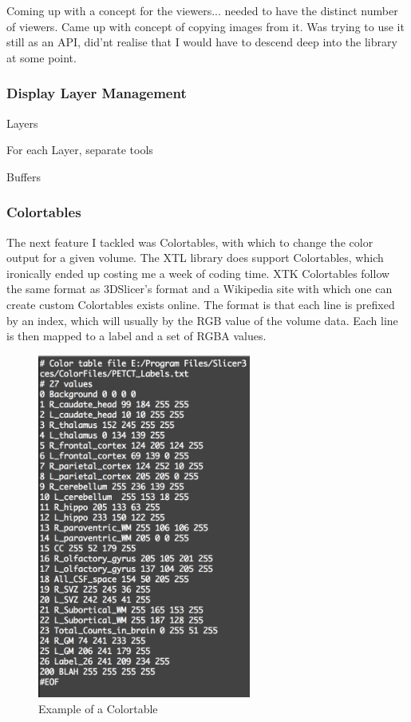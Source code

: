 \documentclass[a4paper,11pt,titlepage]{article}
\begin{document}
Coming up with a concept for the viewers... needed to have the distinct number of viewers.
Came up with concept of copying images from it.
Was trying to use it still as an API, did'nt realise that I would have to descend deep into the library at some point.



\subsubsection{Display Layer Management}

Layers

For each Layer, separate tools

Buffers


\subsubsection{Colortables}

The next feature I tackled was Colortables, with which to change the color output for a given volume. The XTL library does support Colortables, which ironically ended up costing me a week of coding time. XTK Colortables follow the same format as 3DSlicer's format and a Wikipedia site with which one can create custom Colortables exists online. The format is that each line is prefixed by an index, which will usually by the RGB value of the volume data. Each line is then mapped to a label and a set of RGBA values.

\begin{figure}[ht!]
\centering
\includegraphics[width=70mm]{graphics/Colortable_01.png}
\caption{Example of a Colortable}
\label{fig:UIdesign1}
\end{figure}
\end{document}
